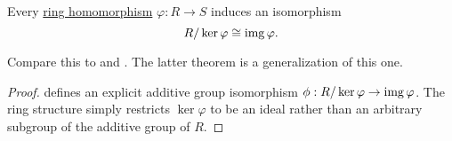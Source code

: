\begin{theorem}\label{thm:homomorphism_theorem_for_rings}
  Every \hyperref[def:ring/homomorphism]{ring homomorphism} \( \varphi: R \to S \) induces an isomorphism
  \begin{equation*}
    R / \ker \varphi \cong \operatorname{img} \varphi.
  \end{equation*}

  Compare this to  and . The latter theorem is a generalization of this one.
\end{theorem}
\begin{proof}
   defines an explicit additive group isomorphism \( \phi: R / \ker \varphi \to \operatorname{img} \varphi \). The ring structure simply restricts \( \ker \varphi \) to be an ideal rather than an arbitrary subgroup of the additive group of \( R \).
\end{proof}

